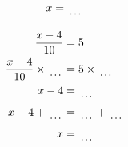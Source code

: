\documentclass[12pt]{article}
\newcounter{minipagecount}
\begin{document}
\begin{multicols}{2}
\begin{minipage}[t]{0.45\textwidth}
\begin{align*}
        x &= \dotuline{\hspace{5mm}}\\
    \end{align*}
\end{minipage} %
\noindent{(\theminipagecount)}\hspace{0.1mm} %
\begin{minipage}[t]{0.45\textwidth} %
    \vspace{-26pt}  %
    \raggedright %
    \begin{align*} %
        \frac{x - 4}{10} &= 5\\
        \frac{x - 4}{10} \times\dotuline{\hspace{5mm}} &= 5 \times\dotuline{\hspace{5mm}}\\
        x - 4 &= \dotuline{\hspace{5mm}}\\
        x - 4 + \dotuline{\hspace{5mm}} &= \dotuline{\hspace{5mm}} + \dotuline{\hspace{5mm}}\\
        x &= \dotuline{\hspace{5mm}}\\
    \end{align*}
\end{minipage} %
\noindent{(\theminipagecount)}\hspace{0.1mm} %
\begin{minipage}[t]{0.45\textwidth} %
    \vspace{-26pt}  %

\end{minipage}
\end{multicols}
\end{document}

